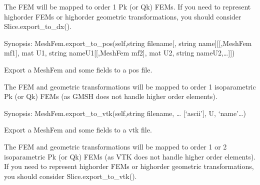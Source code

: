 \documentclass[a4paper,11pt,english]{sphinxmanual}
\begin{document}
\begin{fulllineitems}
\begin{fulllineitems}
The FEM will be mapped to order 1 Pk (or Qk) FEMs. If you need to
represent high\sphinxhyphen{}order FEMs or high\sphinxhyphen{}order geometric transformations,
you should consider Slice.export\_to\_dx().

\end{fulllineitems}


\begin{fulllineitems}
\label{\detokenize{python/cmdref_MeshFem:getfem.MeshFem.export_to_pos}}
Synopsis: MeshFem.export\_to\_pos(self,string filename{[}, string name{]}{[}{[},MeshFem mf1{]}, mat U1, string nameU1{[}{[},MeshFem mf2{]}, mat U2, string nameU2,…{]}{]})

Export a MeshFem and some fields to a pos file.

The FEM and geometric transformations will be mapped to order 1
isoparametric Pk (or Qk) FEMs (as GMSH does not handle higher
order elements).

\end{fulllineitems}


\begin{fulllineitems}
\label{\detokenize{python/cmdref_MeshFem:getfem.MeshFem.export_to_vtk}}
Synopsis: MeshFem.export\_to\_vtk(self,string filename, … {[}‘ascii’{]}, U, ‘name’…)

Export a MeshFem and some fields to a vtk file.

The FEM and geometric transformations will be mapped to order 1
or 2 isoparametric Pk (or Qk) FEMs (as VTK does not handle higher
order elements). If you need to represent high\sphinxhyphen{}order FEMs or
high\sphinxhyphen{}order geometric transformations, you should consider
Slice.export\_to\_vtk().

\end{fulllineitems}



\end{fulllineitems}
\end{document}
